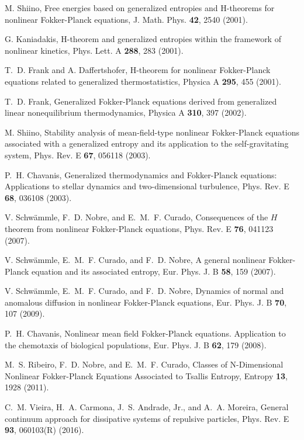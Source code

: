 \documentclass[showpacs,preprintnumbers,amsmath,amssymb,eqsecnum]{revtex4}
\begin{document}
\begin{thebibliography}{99}
M. Shiino, Free energies based on generalized entropies and H-theorems
for nonlinear Fokker-Planck equations, J. Math. Phys. {\bf 42}, 2540 (2001).

G. Kaniadakis, H-theorem and generalized entropies within the
framework of nonlinear kinetics, Phys. Lett. A {\bf 288}, 283 (2001).

T.~D. Frank and A. Daffertshofer, H-theorem for nonlinear Fokker-Planck
equations related to generalized thermostatistics,
Physica A {\bf 295}, 455 (2001).

T.~D. Frank, Generalized Fokker-Planck equations derived from generalized
linear nonequilibrium thermodynamics,
Physica  A \textbf{310}, 397 (2002).

M. Shiino, Stability analysis of mean-field-type nonlinear Fokker-Planck
equations associated with a generalized entropy and its application to
the self-gravitating system,
Phys. Rev. E \textbf{67}, 056118 (2003).

P.~H. Chavanis, Generalized thermodynamics and Fokker-Planck equations:
Applications to stellar dynamics and two-dimensional turbulence,
Phys. Rev. E {\bf 68}, 036108 (2003).

V. Schw\"ammle, F.~D. Nobre, and E.~M.~F. Curado,
Consequences of the $\mathit{H}$ theorem from nonlinear
Fokker-Planck equations, Phys. Rev. E {\bf 76}, 041123 (2007).

V. Schw\"ammle, E.~M.~F. Curado, and F.~D. Nobre,
A general nonlinear Fokker-Planck equation and its associated entropy,
Eur. Phys. J. B {\bf 58}, 159 (2007).

V. Schw\"ammle, E.~M.~F. Curado, and F.~D. Nobre, Dynamics of
normal and anomalous diffusion in nonlinear Fokker-Planck equations,
Eur. Phys. J. B {\bf 70}, 107 (2009).

P.~H. Chavanis, Nonlinear mean field Fokker-Planck equations. Application
to the chemotaxis of biological populations,
Eur. Phys. J. B \textbf{62}, 179 (2008).

M.~S. Ribeiro, F.~D. Nobre, and E.~M.~F. Curado,
Classes of N-Dimensional Nonlinear Fokker-Planck Equations
Associated to Tsallis Entropy,
Entropy \textbf{13}, 1928 (2011).

C.~M. Vieira, H.~A. Carmona, J.~S. Andrade, Jr., and A.~A. Moreira,
General continuum approach for dissipative systems of repulsive particles,
Phys. Rev. E {\bf 93}, 060103(R) (2016).


\end{thebibliography}
\end{document}
